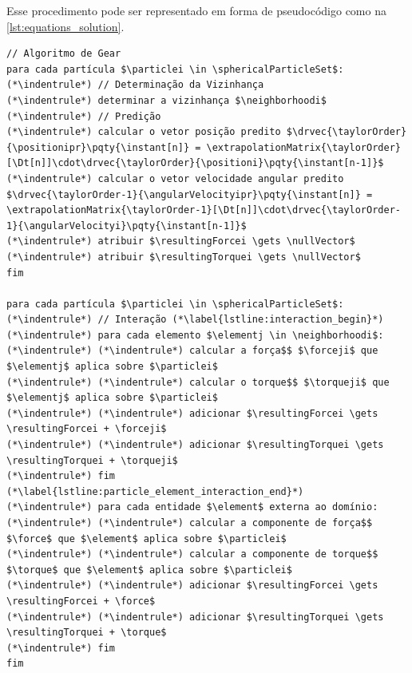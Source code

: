 Esse procedimento pode ser representado em forma de pseudocódigo como na \cref{lst:equations_solution}.

\begin{lstlisting}[float, floatplacement=h, language=pseudocode, label=lst:equations_solution, caption=Pseudocódigo para a solução das equações de movimento de partículas esféricas por meio do algoritmo de Gear.]
// Algoritmo de Gear
para cada partícula $\particlei \in \sphericalParticleSet$:
(*\indentrule*)	// Determinação da Vizinhança
(*\indentrule*)	determinar a vizinhança $\neighborhoodi$
(*\indentrule*)	// Predição
(*\indentrule*)	calcular o vetor posição predito $\drvec{\taylorOrder}{\positionipr}\pqty{\instant[n]} = \extrapolationMatrix{\taylorOrder}[\Dt[n]]\cdot\drvec{\taylorOrder}{\positioni}\pqty{\instant[n-1]}$
(*\indentrule*)	calcular o vetor velocidade angular predito $\drvec{\taylorOrder-1}{\angularVelocityipr}\pqty{\instant[n]} = \extrapolationMatrix{\taylorOrder-1}[\Dt[n]]\cdot\drvec{\taylorOrder-1}{\angularVelocityi}\pqty{\instant[n-1]}$
(*\indentrule*)	atribuir $\resultingForcei \gets \nullVector$
(*\indentrule*)	atribuir $\resultingTorquei \gets \nullVector$
fim

para cada partícula $\particlei \in \sphericalParticleSet$:
(*\indentrule*)	// Interação (*\label{lstline:interaction_begin}*)
(*\indentrule*)	para cada elemento $\elementj \in \neighborhoodi$:
(*\indentrule*)	(*\indentrule*)	calcular a força$$ $\forceji$ que $\elementj$ aplica sobre $\particlei$
(*\indentrule*)	(*\indentrule*)	calcular o torque$$ $\torqueji$ que $\elementj$ aplica sobre $\particlei$
(*\indentrule*)	(*\indentrule*)	adicionar $\resultingForcei \gets \resultingForcei + \forceji$
(*\indentrule*)	(*\indentrule*)	adicionar $\resultingTorquei \gets \resultingTorquei + \torqueji$
(*\indentrule*)	fim (*\label{lstline:particle_element_interaction_end}*)
(*\indentrule*)	para cada entidade $\element$ externa ao domínio:
(*\indentrule*)	(*\indentrule*)	calcular a componente de força$$ $\force$ que $\element$ aplica sobre $\particlei$
(*\indentrule*)	(*\indentrule*)	calcular a componente de torque$$ $\torque$ que $\element$ aplica sobre $\particlei$
(*\indentrule*)	(*\indentrule*)	adicionar $\resultingForcei \gets \resultingForcei + \force$
(*\indentrule*)	(*\indentrule*)	adicionar $\resultingTorquei \gets \resultingTorquei + \torque$
(*\indentrule*)	fim
fim


\end{lstlisting}
